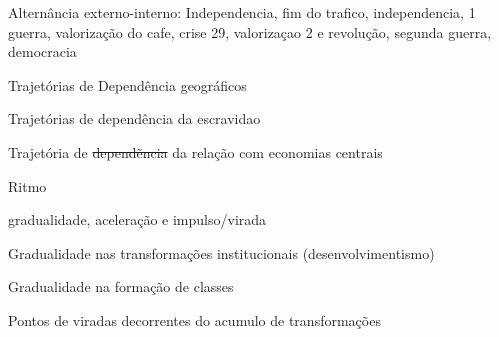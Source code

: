 \begin{esboco}
Alternância externo-interno: Independencia, fim do trafico,
independencia, 1 guerra, valorização do cafe, crise 29, valorizaçao 2 e
revolução, segunda guerra, democracia

Trajetórias de Dependência geográficos

Trajetórias de dependência da escravidao

Trajetória de \sout{dependẽncia}  da relação com economias centrais

Ritmo

gradualidade, aceleração e impulso/virada

Gradualidade nas transformações institucionais (desenvolvimentismo)

Gradualidade na formação de classes

Pontos de viradas decorrentes do acumulo de transformações
\end{esboco}